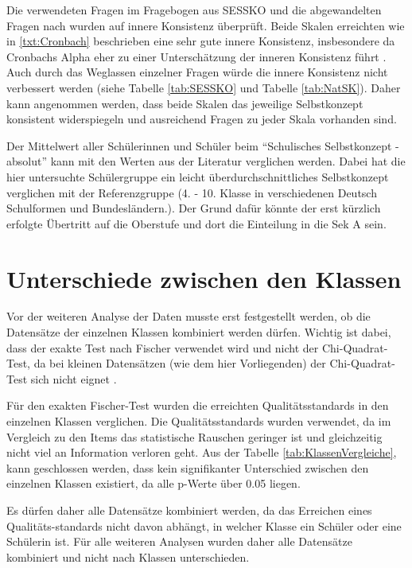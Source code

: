 Die verwendeten Fragen im Fragebogen aus SESSKO \citep{Schone2002} und die abgewandelten Fragen nach \citet{Dierks2014} wurden auf innere Konsistenz überprüft. Beide Skalen erreichten wie in \ref{txt:Cronbach} beschrieben eine sehr gute innere Konsistenz, insbesondere da Cronbachs Alpha eher zu einer Unterschätzung der inneren Konsistenz führt \citep{Eisinga2013}. Auch durch das Weglassen einzelner Fragen würde die innere Konsistenz nicht verbessert werden (siehe Tabelle \ref{tab:SESSKO} und Tabelle \ref{tab:NatSK}). Daher kann angenommen werden, dass beide Skalen das jeweilige Selbstkonzept konsistent widerspiegeln und ausreichend Fragen zu jeder Skala vorhanden sind. 

Der Mittelwert aller Schülerinnen und Schüler beim "`Schulisches Selbstkonzept - absolut"' kann mit den Werten aus der Literatur \citep{Schone2002} verglichen werden. Dabei hat die hier untersuchte Schülergruppe ein leicht überdurchschnittliches Selbstkonzept verglichen mit der Referenzgruppe (4. - 10. Klasse in verschiedenen Deutsch Schulformen und Bundesländern.). Der Grund dafür könnte der erst kürzlich erfolgte Übertritt auf die Oberstufe und dort die Einteilung in die Sek A sein. 

\section{Unterschiede zwischen den Klassen}

Vor der weiteren Analyse der Daten musste erst festgestellt werden, ob die Datensätze der einzelnen Klassen kombiniert werden dürfen. Wichtig ist dabei, dass der exakte Test nach Fischer verwendet wird und nicht der Chi-Quadrat-Test, da bei kleinen Datensätzen (wie dem hier Vorliegenden) der Chi-Quadrat-Test sich nicht eignet \citep{Mehta1984}.

Für den exakten Fischer-Test wurden die erreichten Qualitätsstandards in den einzelnen Klassen verglichen. Die Qualitätsstandards wurden verwendet, da im Vergleich zu den Items das statistische Rauschen geringer ist und gleichzeitig nicht viel an Information verloren geht. Aus der Tabelle \ref{tab:KlassenVergleiche}, kann geschlossen werden, dass kein signifikanter Unterschied zwischen den einzelnen Klassen existiert, da alle p-Werte über 0.05 liegen.

Es dürfen daher alle Datensätze kombiniert werden, da das Erreichen eines Qualitäts-standards nicht davon abhängt, in welcher Klasse ein Schüler oder eine Schülerin ist. Für alle weiteren Analysen wurden daher alle Datensätze kombiniert und nicht nach Klassen unterschieden.

